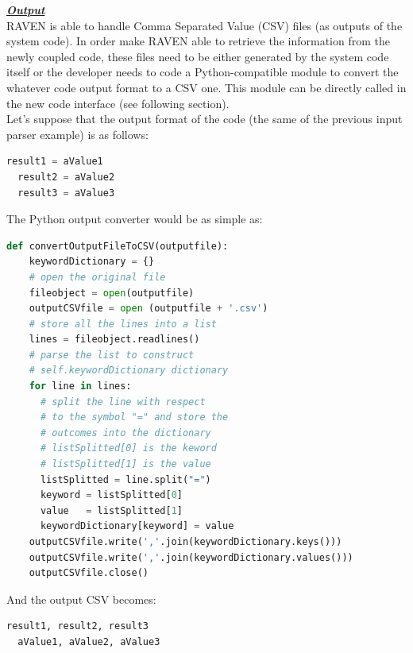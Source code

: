 \textbf{\textit{\underline{Output}}}
\newline
\\RAVEN is able to handle Comma Separated Value (CSV) files (as outputs 
of the system code). In order make RAVEN able to retrieve the information
 from the newly coupled code, these files need to be  either generated by the 
 system code itself or the developer needs to code a Python-compatible 
module to convert the whatever code output format to a CSV one. 
This module can be  directly called in the new code interface (see following section).
\\ Let's suppose that the output format of the code (the same of the previous 
input parser example) is as follows:
\begin{lstlisting}[language=python]
  result1 = aValue1
  result2 = aValue2
  result3 = aValue3
\end{lstlisting} 
The Python output converter would be as simple as:
\begin{lstlisting}[language=python]
def convertOutputFileToCSV(outputfile):
    keywordDictionary = {}
    # open the original file
    fileobject = open(outputfile)
    outputCSVfile = open (outputfile + '.csv')
    # store all the lines into a list
    lines = fileobject.readlines()
    # parse the list to construct 
    # self.keywordDictionary dictionary
    for line in lines:
      # split the line with respect
      # to the symbol "=" and store the
      # outcomes into the dictionary
      # listSplitted[0] is the keword
      # listSplitted[1] is the value
      listSplitted = line.split("=")
      keyword = listSplitted[0]
      value   = listSplitted[1]
      keywordDictionary[keyword] = value
    outputCSVfile.write(','.join(keywordDictionary.keys()))
    outputCSVfile.write(','.join(keywordDictionary.values()))
    outputCSVfile.close()
\end{lstlisting} 
And the output CSV becomes:
\begin{lstlisting}[language=python]
  result1, result2, result3
  aValue1, aValue2, aValue3 
\end{lstlisting} 

